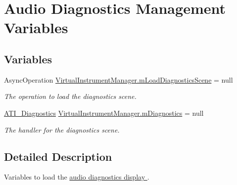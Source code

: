 \hypertarget{group___v_i_m_diag_var}{}\section{Audio Diagnostics Management Variables}
\label{group___v_i_m_diag_var}
\subsection*{Variables}
\begin{DoxyCompactItemize}
\item 
\mbox{\label{group___v_i_m_diag_var_ga90c209c382663b4689a1a72f98b23d41}} 
Async\+Operation \hyperlink{group___v_i_m_diag_var_ga90c209c382663b4689a1a72f98b23d41}{Virtual\+Instrument\+Manager.\+m\+Load\+Diagnostics\+Scene} = null
\begin{DoxyCompactList}\small\item\em The operation to load the diagnostics scene. \end{DoxyCompactList}\item 
\mbox{\label{group___v_i_m_diag_var_ga61670e91d1470a1d9a57829ac35688f1}} 
\hyperlink{group___audio_testing_class_a_t_i___diagnostics}{A\+T\+I\+\_\+\+Diagnostics} \hyperlink{group___v_i_m_diag_var_ga61670e91d1470a1d9a57829ac35688f1}{Virtual\+Instrument\+Manager.\+m\+Diagnostics} = null
\begin{DoxyCompactList}\small\item\em The handler for the diagnostics scene. \end{DoxyCompactList}\end{DoxyCompactItemize}


\subsection{Detailed Description}
Variables to load the \hyperlink{group___audio_testing_class_a_t_i___diagnostics}{audio diagnostics display }. 